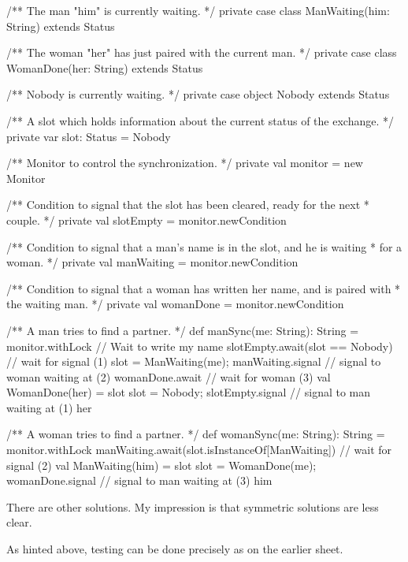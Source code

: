 \begin{answer}
\begin{scala}
{  /** The man "him" is currently waiting. */
  private case class ManWaiting(him: String) extends Status

  /** The woman "her" has just paired with the current man. */
  private case class WomanDone(her: String) extends Status

  /** Nobody is currently waiting. */
  private case object Nobody extends Status

  /** A slot which holds information about the current status of the exchange. */
  private var slot: Status = Nobody

  /** Monitor to control the synchronization. */
  private val monitor = new Monitor

  /** Condition to signal that the slot has been cleared, ready for the next
    * couple. */
  private val slotEmpty = monitor.newCondition

  /** Condition to signal that a man's name is in the slot, and he is waiting
    * for a woman. */
  private val manWaiting = monitor.newCondition

  /** Condition to signal that a woman has written her name, and is paired with
    * the waiting man. */
  private val womanDone = monitor.newCondition

  /** A man tries to find a partner. */
  def manSync(me: String): String = monitor.withLock{
    // Wait to write my name
    slotEmpty.await(slot == Nobody)          // wait for signal (1)
    slot = ManWaiting(me); manWaiting.signal  // signal to woman waiting at (2)
    womanDone.await                          // wait for woman (3)
    val WomanDone(her) = slot
    slot = Nobody; slotEmpty.signal         // signal to man waiting at (1)
    her
  }

  /** A woman tries to find a partner. */
  def womanSync(me: String): String = monitor.withLock{
    manWaiting.await(slot.isInstanceOf[ManWaiting]) // wait for signal (2)
    val ManWaiting(him) = slot
    slot = WomanDone(me); womanDone.signal   // signal to man waiting at (3)
    him
  }
}
\end{scala}

There are other solutions.  My impression is that symmetric solutions are
less clear.

As hinted above, testing can be done precisely as on the earlier sheet.
\end{answer}



